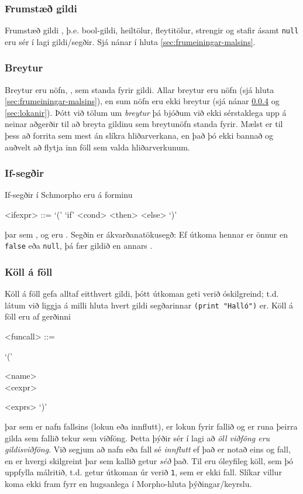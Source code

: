 \documentclass[a4paper,icelandic]{article}
\begin{document}
\subsubsection{Frumstæð gildi}
\label{sec:frumstad-gildi}
Frumstæð gildi , þ.e. bool-gildi, heiltölur, fleytitölur, strengir og
stafir ásamt \verb|null| eru sér í lagi gildi/segðir. Sjá nánar í hluta
\ref{sec:frumeiningar-malsins}.

\subsubsection{Breytur}
\label{sec:breytur-3}
Breytur eru nöfn, , sem standa fyrir gildi. Allar breytur eru nöfn
(sjá hluta \ref{sec:frumeiningar-malsins}), en sum nöfn eru ekki
breytur (sjá nánar \ref{sec:koll-foll} og \ref{sec:lokanir}). Þótt við
tölum um \emph{breytur} þá bjóðum við ekki sérstaklega upp á neinar
aðgerðir til að breyta gildinu sem breytunöfn standa fyrir. Mælst er til þess að
forrita sem mest án slíkra hliðarverkana, en það þó ekki bannað og auðvelt að
flytja inn föll sem valda hliðarverkunum.

\subsubsection{If-segðir}
\label{sec:if-segdir}

If-segðir í Schmorpho eru á forminu
\begin{grammar}
  <ifexpr> ::= `(' `if' <cond> <then> <else> `)'
\end{grammar}
þar sem ,  og  eru
. Segðin  er ákvarðanatökusegð: Ef útkoma hennar
er önnur en \verb|false| eða \verb|null|, þá fær  gildið
 en annars .

\subsubsection{Köll á föll}
\label{sec:koll-foll}
Köll á föll gefa alltaf eitthvert gildi, þótt útkoman geti verið
óskilgreind; t.d. látum við liggja á milli hluta hvert gildi
segðarinnar \verb|(print "Halló")| er. Köll á föll eru af gerðinni
\begin{grammar} <funcall> ::=
  \begin{syntdiag*} `('
    \begin{stack} <name> \\ <cexpr>
    \end{stack} <exprs> `)'
  \end{syntdiag*}
\end{grammar}
þar sem  er nafn fallsins (lokun eða innflutt),
 er lokun fyrir fallið og  er runa þeirra
gilda sem fallið tekur sem viðföng. Þetta þýðir sér í lagi að
\emph{öll viðföng eru gildisviðföng}. Við segjum að nafn eða fall sé
\emph{innflutt} ef það er notað eins og fall, en er hvergi skilgreint
þar sem kallið getur \emph{séð} það. Til eru óleyfileg köll, sem þó
uppfylla málritið, t.d. getur útkoman úr  verið \verb|1|,
sem er ekki fall. Slíkar villur koma ekki fram fyrr en hugsanlega í
Morpho-hluta þýðingar/keyrslu.
\end{document}
